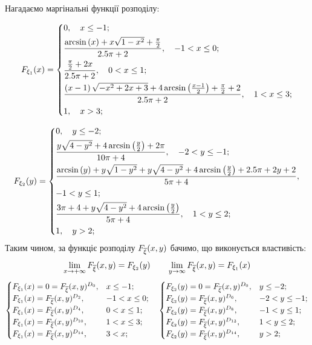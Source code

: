 \documentclass[14pt,a4paper]{scrartcl}
\theoremstyle{definition}
\theoremstyle{remark}
\theoremstyle{definition}
\theoremstyle{definition}
\begin{document}
Нагадаємо маргінальні функції розподілу:

$$
F_{\xi_1} (x) = \begin{dcases}
0, \quad x \leq -1 ;\\
	  \dfrac{\arcsin\left(x\right)+x\sqrt{1-x^2}+\frac{{\pi}}{2} }{2.5\pi + 2} , \quad -1 < x \leq 0; \\
	\dfrac{\frac{{\pi}}{2} +  2x }{2.5\pi + 2} , \quad 0 < x \leq 1; \\
	\dfrac{\left(x-1\right)\sqrt{-x^2+2x+3}+4\arcsin\left(\frac{x-1}{2}\right) + \frac{\pi}{2}+2 }{2.5\pi + 2} , \quad 1 < x \leq 3; \\
	1, \quad x > 3 ;\\
\end{dcases}
$$

$$
F_{\xi_2} (y) = \begin{dcases}
	0, \quad y \leq  -2;\\
 \dfrac{y\sqrt{4-y^2}+4\arcsin\left(\frac{y}{2}\right) + 2{\pi}}{10\pi + 4} , \quad -2 < y \leq -1;\\
 \dfrac{\arcsin\left(y\right)+y\sqrt{1-y^2}+ y\sqrt{4-y^2}+4\arcsin\left(\frac{y}{2}\right) + 2.5\pi + 2y + 2}{5\pi + 4}   ,\\  -1 < y \leq 1; \\
		 	 \dfrac{3\pi + 4 +y\sqrt{4-y^2}+4\arcsin\left(\frac{y}{2}\right)}{5\pi + 4} , \quad 1 < y \leq 2;\\
		1, \quad y >  2;\\
\end{dcases}
$$
Таким чином, за функціє розподілу $F_{\overline{\xi}} (x,y)$ бачимо, що виконується властивість:
$$
 \lim\limits_{x\to  +\infty}{F_{\overline{\xi}} (x,y)} = F_{\xi_2}(y) \qquad  \lim\limits_{y\to  \infty}{ F_{\overline{\xi}} (x,y)} = F_{\xi_1} (x)
$$
$$
\begin{cases}
F_{\xi_1}(x) = 0 = F_{\overline{\xi}}(x,y)^{D_0}, & x \leq -1 ;\\
F_{\xi_1}(x) = F_{\overline{\xi}}(x,y)^{D_2}, & -1 < x \leq 0; \\
F_{\xi_1}(x) = F_{\overline{\xi}}(x,y)^{D_4}, & 0 < x \leq 1; \\
F_{\xi_1}(x) = F_{\overline{\xi}}(x,y)^{D_{10}}, & 1 < x \leq 3; \\
F_{\xi_1}(x) = F_{\overline{\xi}}(x,y)^{D_{14}}, & 3 < x; \\
\end{cases}
\quad
\begin{cases}
F_{\xi_2}(y) = 0 = F_{\overline{\xi}}(x,y)^{D_0}, &y \leq  -2;\\
F_{\xi_2}(y) = F_{\overline{\xi}}(x,y)^{D_6}, & -2 < y \leq -1;\\
F_{\xi_2}(y) = F_{\overline{\xi}}(x,y)^{D_8}, & -1 < y \leq 1; \\
F_{\xi_2}(y) = F_{\overline{\xi}}(x,y)^{D_{13}}, & 1 < y \leq 2;\\
F_{\xi_2}(y) = F_{\overline{\xi}}(x,y)^{D_{14}}, & y >  2;\\
\end{cases}
$$
\end{document}
